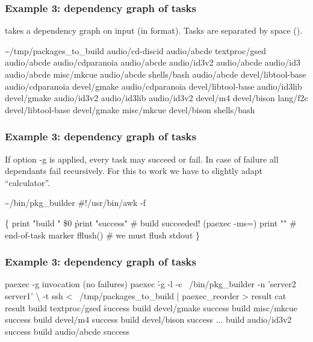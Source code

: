 \documentclass[hyperref={colorlinks=true}]{beamer}
\begin{document}
\begin{frame}[fragile]
  \frametitle{Example 3: dependency graph of tasks}
 takes a dependency graph on input (in  format).
Tasks are separated by space ().
  \begin{block}{}
      \begin{CodeSmall}{\~{}/tmp/packages\_to\_build}
audio/cd-discid audio/abcde
textproc/gsed audio/abcde
audio/cdparanoia audio/abcde
audio/id3v2 audio/abcde
audio/id3 audio/abcde
misc/mkcue audio/abcde
shells/bash audio/abcde
devel/libtool-base audio/cdparanoia
devel/gmake audio/cdparanoia
devel/libtool-base audio/id3lib
devel/gmake audio/id3v2
audio/id3lib audio/id3v2
devel/m4 devel/bison
lang/f2c devel/libtool-base
devel/gmake misc/mkcue
devel/bison shells/bash
      \end{CodeSmall}
  \end{block}
\end{frame}

\begin{frame}[fragile]
  \frametitle{Example 3: dependency graph of tasks}
If option -g is applied, every task may succeed or fail. In case of failure
all dependants fail recursively.
For this to work we have to slightly adapt ``calculator''.
  \begin{block}{}
      \begin{CodeSmall}{\~{}/bin/pkg\_builder}
#!/usr/bin/awk -f

\{
   print "build " \$0
   \h{print "success"} # build succeeded! (paexec -ms=)
   print ""        # end-of-task marker
   fflush()        # we must flush stdout
\}
      \end{CodeSmall}
  \end{block}
\end{frame}

\begin{frame}[fragile]
  \frametitle{Example 3: dependency graph of tasks}

  \begin{block}{}
      \begin{CodeSmall}{paexec -g invocation (no failures)}
\prompt{\$} paexec \h{-g} -l -c ~/bin/pkg_builder -n 'server2 server1' \textbackslash
    -t ssh < ~/tmp/packages_to_build | paexec_reorder > result
\prompt{\$} cat result
build textproc/gsed
\h{success}
build devel/gmake
success
build misc/mkcue
success
build devel/m4
success
build devel/bison
success
...
build audio/id3v2
success
build audio/abcde
success
\prompt{\$}
      \end{CodeSmall}
  \end{block}
\end{frame}
\end{document}
